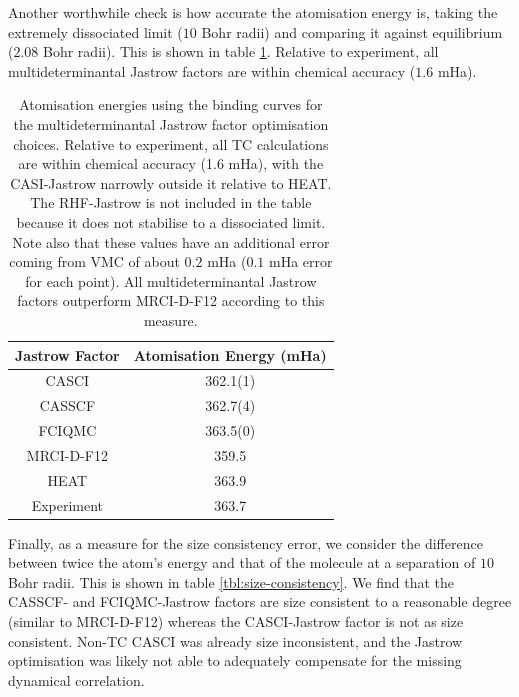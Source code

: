 Another worthwhile check is how accurate the atomisation energy is, taking the extremely dissociated limit ($10$ Bohr radii) and comparing it against equilibrium ($2.08$ Bohr radii). This is shown in table \ref{tbl:binding-atomisation-energies}. Relative to experiment, all multideterminantal Jastrow factors are within chemical accuracy ($1.6$ mHa).

\begin{table}[!h]
    \centering
        \begin{tabular}{c|c}
            Jastrow Factor & Atomisation Energy (mHa) \\
            \hline
            CASCI & 362.1(1) \\
            CASSCF & 362.7(4) \\
            FCIQMC & 363.5(0) \\
            \bottomrule
            MRCI-D-F12 & 359.5 \\
            HEAT\supercite{fellerSurvey2008} & 363.9 \\
            Experiment\supercite{leroyAccurate2006} & 363.7
        \end{tabular}
    \caption{Atomisation energies using the binding curves for the multideterminantal Jastrow factor optimisation choices. Relative to experiment, all TC calculations are within chemical accuracy (1.6 mHa), with the CASI-Jastrow narrowly outside it relative to HEAT. The RHF-Jastrow is not included in the table because it does not stabilise to a dissociated limit. Note also that these values have an additional error coming from VMC of about $0.2$ mHa ($0.1$ mHa error for each point). All multideterminantal Jastrow factors outperform MRCI-D-F12 according to this measure.}
    \label{tbl:binding-atomisation-energies}
\end{table}

Finally, as a measure for the size consistency error, we consider the difference between twice the atom's energy and that of the molecule at a separation of $10$ Bohr radii. This is shown in table \ref{tbl:size-consistency}. We find that the CASSCF- and FCIQMC-Jastrow factors are size consistent to a reasonable degree (similar to MRCI-D-F12) whereas the CASCI-Jastrow factor is not as size consistent. Non-TC CASCI was already size inconsistent, and the Jastrow optimisation was likely not able to adequately compensate for the missing dynamical correlation.

